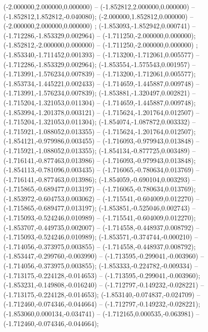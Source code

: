  (-2.000000,2.000000,0.000000) -- (-1.852812,2.000000,0.000000) -- (-1.852812,1.852812,-0.040080);
 (-2.000000,1.852812,0.000000) -- (-2.000000,2.000000,0.000000) ;
 (-1.853093,-1.852942,0.000741) -- (-1.712286,-1.853329,0.002964) -- (-1.711250,-2.000000,0.000000);
 (-1.852812,-2.000000,0.000000) -- (-1.711250,-2.000000,0.000000) ;
 (-1.853340,-1.711452,0.001393) -- (-1.713200,-1.712061,0.005577) -- (-1.712286,-1.853329,0.002964);
 (-1.853554,-1.575543,0.001957) -- (-1.713991,-1.576234,0.007839) -- (-1.713200,-1.712061,0.005577);
 (-1.853734,-1.445221,0.002433) -- (-1.714659,-1.445887,0.009748) -- (-1.713991,-1.576234,0.007839);
 (-1.853881,-1.320497,0.002821) -- (-1.715204,-1.321053,0.011304) -- (-1.714659,-1.445887,0.009748);
 (-1.853994,-1.201378,0.003121) -- (-1.715624,-1.201764,0.012507) -- (-1.715204,-1.321053,0.011304);
 (-1.854074,-1.087872,0.003332) -- (-1.715921,-1.088052,0.013355) -- (-1.715624,-1.201764,0.012507);
 (-1.854121,-0.979986,0.003455) -- (-1.716093,-0.979943,0.013848) -- (-1.715921,-1.088052,0.013355);
 (-1.854134,-0.877725,0.003489) -- (-1.716141,-0.877463,0.013986) -- (-1.716093,-0.979943,0.013848);
 (-1.854113,-0.781096,0.003435) -- (-1.716065,-0.780634,0.013769) -- (-1.716141,-0.877463,0.013986);
 (-1.854059,-0.690104,0.003293) -- (-1.715865,-0.689477,0.013197) -- (-1.716065,-0.780634,0.013769);
 (-1.853972,-0.604753,0.003062) -- (-1.715541,-0.604009,0.012270) -- (-1.715865,-0.689477,0.013197);
 (-1.853851,-0.525046,0.002743) -- (-1.715093,-0.524246,0.010989) -- (-1.715541,-0.604009,0.012270);
 (-1.853707,-0.449735,0.002007) -- (-1.714558,-0.448937,0.008792) -- (-1.715093,-0.524246,0.010989);
 (-1.853571,-0.374744,-0.000210) -- (-1.714056,-0.373975,0.003855) -- (-1.714558,-0.448937,0.008792);
 (-1.853447,-0.299760,-0.003990) -- (-1.713595,-0.299041,-0.003960) -- (-1.714056,-0.373975,0.003855);
 (-1.853333,-0.224782,-0.009334) -- (-1.713175,-0.224128,-0.014653) -- (-1.713595,-0.299041,-0.003960);
 (-1.853231,-0.149808,-0.016240) -- (-1.712797,-0.149232,-0.028221) -- (-1.713175,-0.224128,-0.014653);
 (-1.853140,-0.074837,-0.024709) -- (-1.712460,-0.074346,-0.044664) -- (-1.712797,-0.149232,-0.028221);
 (-1.853060,0.000134,-0.034741) -- (-1.712165,0.000535,-0.063981) -- (-1.712460,-0.074346,-0.044664);
